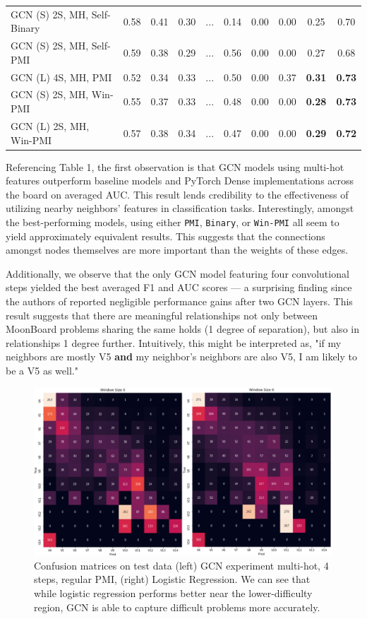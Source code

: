\documentclass{article}
\begin{document}
\begin{table}[h!]
\begin{tabular}{@{}lccclccccc@{}}
GCN (S) 2S, MH, Self-Binary & 0.58  & 0.41  & 0.30  & ... & 0.14 & 0.00 & 0.00 & 0.25            & 0.70            \\
GCN (S) 2S, MH, Self-PMI    & 0.59  & 0.38  & 0.29  & ... & 0.56 & 0.00 & 0.00 & 0.27            & 0.68            \\
GCN (L) 4S, MH, PMI         & 0.52  & 0.34  & 0.33  & ... & 0.50 & 0.00 & 0.37 & \textbf{0.31}            & \textbf{0.73}            \\
GCN (S) 2S, MH, Win-PMI     & 0.55  & 0.37  & 0.33  & ... & 0.48 & 0.00 & 0.00 & \textbf{0.28}            & \textbf{0.73}            \\
GCN (L) 2S, MH, Win-PMI     & 0.57  & 0.38  & 0.34  & ... & 0.47 & 0.00 & 0.00 & \textbf{0.29}            & \textbf{0.72}            \\ \bottomrule
\end{tabular}
\end{table}

Referencing Table 1, the first observation is that GCN models using multi-hot features outperform baseline models and PyTorch Dense implementations across the board on averaged AUC. This result lends credibility to the effectiveness of utilizing nearby neighbors' features in classification tasks. Interestingly, amongst the best-performing models, using either \texttt{PMI}, \texttt{Binary}, or \texttt{Win-PMI} all seem to yield approximately equivalent results. This suggests that the connections amongst nodes themselves are more important than the weights of these edges. 

Additionally, we observe that the only GCN model featuring four convolutional steps yielded the best averaged F1 and AUC scores --- a surprising finding since the authors of \cite{yao2018graph} reported negligible performance gains after two GCN layers. This result suggests that there are meaningful relationships not only between MoonBoard problems sharing the same holds (1 degree of separation), but also in relationships 1 degree further. Intuitively, this might be interpreted as, "if my neighbors are mostly V5 \textbf{and} my neighbor's neighbors are also V5, I am likely to be a V5 as well."

\begin{figure}[h]
\centering
\includegraphics[width=.65\textwidth]{confusions}

\label{fig: Confusion matrices}
\caption{Confusion matrices on test data (left) GCN experiment multi-hot, 4 steps, regular PMI, (right) Logistic Regression. We can see that while logistic regression performs better near the lower-difficulty region, GCN is able to capture difficult problems more accurately.}
\end{figure}
\end{document}
